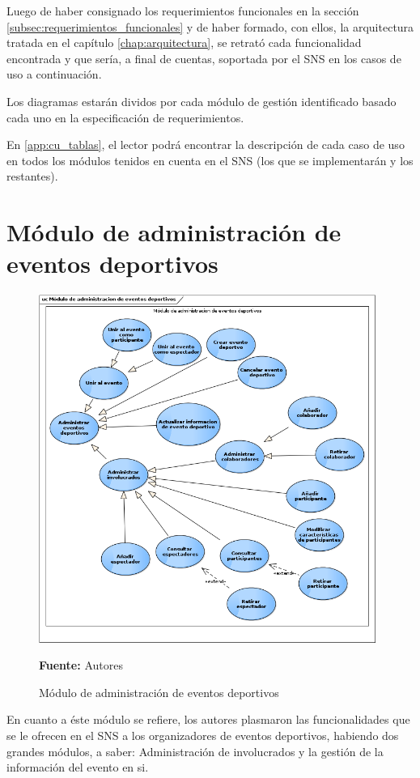 Luego de haber consignado los requerimientos funcionales en la sección \ref{subsec:requerimientos_funcionales} y de haber formado, con ellos, la arquitectura tratada en el capítulo \ref{chap:arquitectura}, se retrató cada funcionalidad encontrada y que sería, a final de cuentas, soportada por el SNS en los casos de uso a continuación.

Los diagramas estarán dividos por cada módulo de gestión identificado basado cada uno en la especificación de requerimientos.

En \ref{app:cu_tablas}, el lector podrá encontrar la descripción de cada caso de uso en todos los módulos tenidos en cuenta en el SNS (los que se implementarán y los restantes).

\section{Módulo de administración de eventos deportivos}

\begin{figure}[!htb]
  \begin{center}
    \includegraphics[width=11cm]{./imagenes/casos_uso/gestion_evento.png}
    \caption{Módulo de administración de eventos deportivos}
    \label{fig:cu_admin_eve}
    \textbf{Fuente:} Autores \\
  \end{center}
\end{figure}

En cuanto a éste módulo se refiere, los autores plasmaron las funcionalidades que se le ofrecen en el SNS a los organizadores de eventos deportivos, habiendo dos grandes módulos, a saber: Administración de involucrados y la gestión de la información del evento en si.

